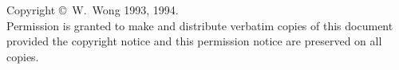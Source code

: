 \vfill
\begin{flushleft}
Copyright \copyright\ W.\ Wong 1993, 1994. \\
\vspace{14pt}
Permission is granted to make and distribute verbatim copies of this
document provided the copyright notice and this permission notice are
preserved on all copies.
\end{flushleft}
\newpage

